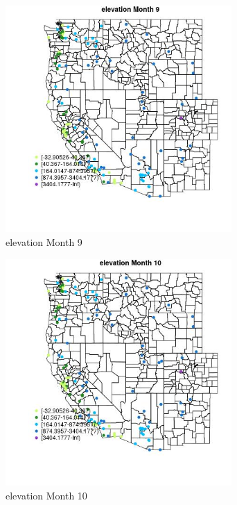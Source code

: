 \begin{figure} 
\centering  
\includegraphics[width=0.77\textwidth]{Code_Outputs/Report_ML_input_PM25_Step4_part_e_de_duplicated_aves_MapObsMo9elevation.jpg} 
\caption{\label{fig:Report_ML_input_PM25_Step4_part_e_de_duplicated_avesMapObsMo9elevation}elevation Month 9} 
\end{figure} 
 

\begin{figure} 
\centering  
\includegraphics[width=0.77\textwidth]{Code_Outputs/Report_ML_input_PM25_Step4_part_e_de_duplicated_aves_MapObsMo10elevation.jpg} 
\caption{\label{fig:Report_ML_input_PM25_Step4_part_e_de_duplicated_avesMapObsMo10elevation}elevation Month 10} 
\end{figure} 
 

